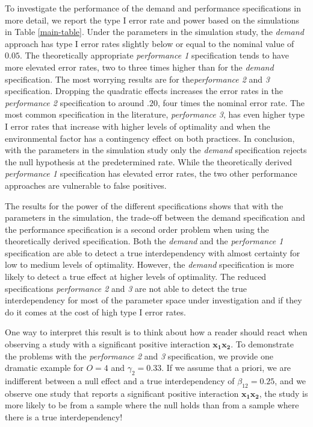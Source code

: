 \documentclass[12pt]{article}
\begin{document}
To investigate the performance of the demand and performance specifications in more detail, we report the type I error rate and power based on the simulations in Table \ref{main-table}.
Under the parameters in the simulation study, the \emph{demand} approach has type I error rates slightly below or equal to the nominal value of \(0.05\). The theoretically appropriate \emph{performance 1} specification tends to have more elevated error rates, two to three times higher than for the \emph{demand} specification. The most worrying results are for the\emph{performance 2} and \emph{3} specification. Dropping the quadratic effects increases the error rates in the \emph{performance 2} specification to around \(.20\), four times the nominal error rate. The most common specification in the literature, \emph{performance 3}, has even higher type I error rates that increase with higher levels of optimality and when the environmental factor has a contingency effect on both practices. In conclusion, with the parameters in the simulation study only the \emph{demand} specification rejects the null hypothesis at the predetermined rate. While the theoretically derived \emph{performance 1} specification has elevated error rates, the two other performance approaches are vulnerable to false positives.

The results for the power of the different specifications shows that with the parameters in the simulation, the trade-off between the demand specification and the performance specification is a second order problem when using the theoretically derived specification. Both the \emph{demand} and the \emph{performance 1} specification are able to detect a true interdependency with almost certainty for low to medium levels of optimality. However, the \emph{demand} specification is more likely to detect a true effect at higher levels of optimality. The reduced specifications \emph{performance 2} and \emph{3} are not able to detect the true interdependency for most of the parameter space under investigation and if they do it comes at the cost of high type I error rates.

One way to interpret this result is to think about how a reader should react when observing a study with a significant positive interaction \(\mathbf{x_1 x_2}\). To demonstrate the problems with the \emph{performance 2} and \emph{3} specification, we provide one dramatic example for \(O = 4\) and \(\gamma_2 = 0.33\). If we assume that a priori, we are indifferent between a null effect and a true interdependency of \(\beta_{12} = 0.25\), and we observe one study that reports a significant positive interaction \(\mathbf{x_{1} x_{2}}\), the study is more likely to be from a sample where the null holds than from a sample where there is a true interdependency!
\end{document}
